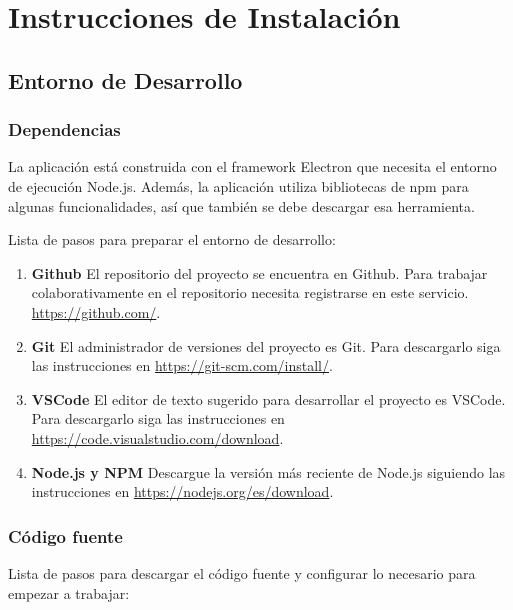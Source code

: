 \chapter{Instrucciones de Instalación}

\section{Entorno de Desarrollo}

\subsection{Dependencias}
La aplicación está construida con el framework Electron que necesita el entorno de ejecución Node.js. Además, la aplicación utiliza bibliotecas de npm para algunas funcionalidades, así que también se debe descargar esa herramienta. 

Lista de pasos para preparar el entorno de desarrollo:
\begin{enumerate}
	\item \textbf{Github} El repositorio del proyecto se encuentra en Github. Para trabajar colaborativamente en el repositorio necesita registrarse en este servicio. \url{https://github.com/}.
	
	\item \textbf{Git} El administrador de versiones del proyecto es Git. Para descargarlo siga las instrucciones en \url{https://git-scm.com/install/}.
	
	\item \textbf{VSCode} El editor de texto sugerido para desarrollar el proyecto es VSCode. Para descargarlo siga las instrucciones en \url{https://code.visualstudio.com/download}.
	
	\item \textbf{Node.js y NPM} Descargue la versión más reciente de Node.js siguiendo las instrucciones en \url{https://nodejs.org/es/download}.
    
\end{enumerate}


\subsection{Código fuente}
Lista de pasos para descargar el código fuente y configurar lo necesario para empezar a trabajar:

